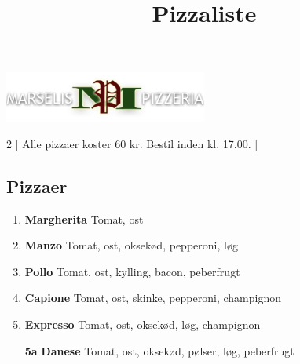 \documentclass[danish,a4paper]{article}
\title{Pizzaliste}
\date{\vspace{-10ex}}
\author{\vspace{-10ex}}
\begin{document}

\maketitle

\begin{center}
    \includegraphics[width=0.5\textwidth]{logo.png}
\end{center}

\begin{multicols}{2}
[
\noindent Alle pizzaer koster 60 kr. Bestil inden kl. 17.00.
]
\subsection*{Pizzaer}
\begin{enumerate}[label={\large\textbf{\arabic*}.}]
    \setcounter{enumi}{0}
    \item \textbf{\textcolor{vegigreen}{Margherita}} Tomat, ost
    \item \textbf{Manzo} Tomat, ost, oksekød, pepperoni, løg
    \item \textbf{Pollo} Tomat, ost, kylling, bacon, peberfrugt 
    \item \textbf{Capione} Tomat, ost, skinke, pepperoni, champignon
    \item \textbf{Expresso} Tomat, ost, oksekød, løg, champignon 
    \item[\large\textbf{5a}] \textbf{Danese} Tomat, ost, oksekød, pølser, løg, peberfrugt 


\end{enumerate}
\end{multicols}
\end{document}
